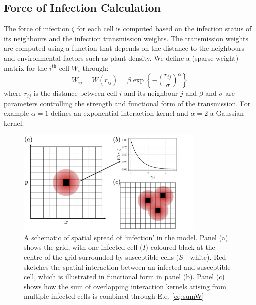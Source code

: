 \documentclass[12pt]{article}
\begin{document}
\subsection{Force of Infection Calculation}
The force of infection $\zeta$ for each cell is computed based on the infection status of its neighbours and the infection transmission weights. The transmission weights are computed using a function that depends on the distance to the neighbours and environmental factors such as plant density. We define a (sparse weight) matrix for the $i^{\textrm{th}}$ cell $W_i$ through:
\begin{equation}\label{eq:W}
W_{ij} = W(r_{ij}) = \beta \exp\left\{ - \left (\frac{r_{ij}}{\sigma} \right)^\alpha \right\}
\end{equation}
where $r_{ij}$ is the distance between cell $i$ and its neighbour $j$ and $\beta$ and $\sigma$ are parameters controlling the strength and functional form of the transmission. For example $\alpha = 1$ defines an exponential interaction kernel and $\alpha = 2$ a Gaussian  kernel.

\begin{figure}[h]
    \centering
    \includegraphics[width=0.8\textwidth]{sketch1.png}
    \caption{A schematic of spatial spread of `infection' in the model. Panel (a) shows the grid, with one infected cell ($I$) coloured black at the centre of the grid surrounded by susceptible cells ($S$ - white). Red sketches the spatial interaction between an infected and susceptible cell, which is illustrated in functional form in panel (b). Panel (c) shows how the sum of overlapping interaction kernels arising from multiple infected cells is combined through E.q. \ref{eq:sumW}}
    \label{fig:sketch1}
\end{figure}
\end{document}
